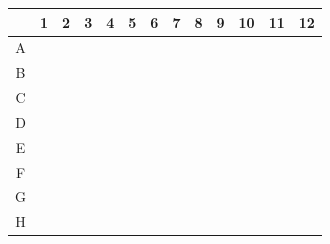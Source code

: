 \documentclass[UTF8,10pt,a4paper,fontset=fandol]{ctexart}
\begin{document}
\begin{center}
\scriptsize
\begin{tabular}{c|*{12}{p{0.52cm}|}}
 & 1 & 2 & 3 & 4 & 5 & 6 & 7 & 8 & 9 & 10 & 11 & 12\\ \hline
A & & & &
\parbox[t]{0.5cm}{} &
\parbox[t]{0.5cm}{} &
\parbox[t]{0.5cm}{} &
\parbox[t]{0.5cm}{} &
\parbox[t]{0.5cm}{} &
\parbox[t]{0.5cm}{} &
& & \\ \hline
B & & & &
\parbox[t]{0.5cm}{} &
\parbox[t]{0.5cm}{} &
\parbox[t]{0.5cm}{} &
\parbox[t]{0.5cm}{} &
\parbox[t]{0.5cm}{} &
\parbox[t]{0.5cm}{} &
& & \\ \hline
C & & & &
\parbox[t]{0.5cm}{} &
\parbox[t]{0.5cm}{} &
\parbox[t]{0.5cm}{} &
\parbox[t]{0.5cm}{} &
\parbox[t]{0.5cm}{} &
\parbox[t]{0.5cm}{} &
& & \\ \hline
D & & & &
\parbox[t]{0.5cm}{} &
\parbox[t]{0.5cm}{} &
\parbox[t]{0.5cm}{} &
\parbox[t]{0.5cm}{} &
\parbox[t]{0.5cm}{} &
\parbox[t]{0.5cm}{} &
& & \\ \hline
E & & & &
\parbox[t]{0.5cm}{} &
\parbox[t]{0.5cm}{} &
\parbox[t]{0.5cm}{} &
\parbox[t]{0.5cm}{} &
\parbox[t]{0.5cm}{} &
\parbox[t]{0.5cm}{} &
& & \\ \hline
F & & & &
\parbox[t]{0.5cm}{} &
\parbox[t]{0.5cm}{} &
\parbox[t]{0.5cm}{} &
\parbox[t]{0.5cm}{} &
\parbox[t]{0.5cm}{} &
\parbox[t]{0.5cm}{} &
& & \\ \hline
G & & & &
\parbox[t]{0.5cm}{} &
\parbox[t]{0.5cm}{} &
\parbox[t]{0.5cm}{} &
\parbox[t]{0.5cm}{} &
\parbox[t]{0.5cm}{} &
\parbox[t]{0.5cm}{} &
& & \\ \hline
H & & & &
\parbox[t]{0.5cm}{} &
\parbox[t]{0.5cm}{} &
\parbox[t]{0.5cm}{} &
\parbox[t]{0.5cm}{} &
\parbox[t]{0.5cm}{} &
\parbox[t]{0.5cm}{} &
& & \\ \hline
\end{tabular}
\end{center}
\end{document}
